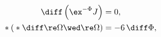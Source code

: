 \begin{equation}
\label{2spinSU4cond}
\begin{aligned}
   \diff \left(\ex^{-\Phi}J \right) &= 0 , \\
   {} * ({} * \diff\re\Omega \wed \re\Omega ) &= - 6 \,\diff \Phi ,
\end{aligned}
\end{equation}

